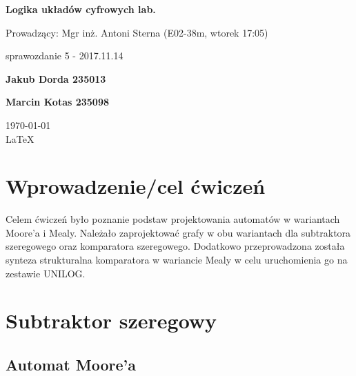 \documentclass[12pt,a4paper]{article}
\begin{document}
	
	\begin{titlepage}
		
		\centering
		{\huge\bfseries Logika układów cyfrowych lab.\par}
		
		\vspace{0.5cm}
		Prowadzący: Mgr inż. Antoni Sterna (E02-38m, wtorek 17:05) \\
	
		\vspace{1.1cm}
		{\Large sprawozdanie 5 - 2017.11.14\par}
		\vfill
		
		{\large\bfseries Jakub Dorda 235013\par}
		{\large\bfseries Marcin Kotas 235098\par}
		
		\vspace{1cm}
		\today \\ \LaTeX
		
		\restoregeometry
	\end{titlepage}


	\section{Wprowadzenie/cel ćwiczeń}
	
		Celem ćwiczeń było poznanie podstaw projektowania automatów w wariantach Moore'a i Mealy. Należało zaprojektować grafy w obu wariantach dla subtraktora szeregowego oraz komparatora szeregowego. Dodatkowo przeprowadzona została synteza strukturalna komparatora w wariancie Mealy w celu uruchomienia go na zestawie UNILOG.
		
		
	\section{Subtraktor szeregowy}
	
		\subsection{Automat Moore'a}
		
\end{document}
